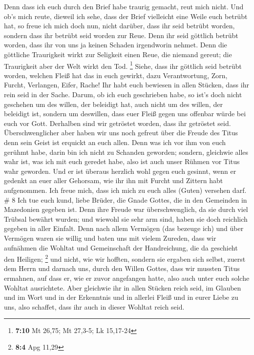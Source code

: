  Denn dass ich euch durch den Brief habe traurig gemacht,
reut mich nicht. Und ob's mich reute, dieweil ich sehe, dass der Brief
vielleicht eine Weile euch betrübt hat,  so freue ich mich
doch nun, nicht darüber, dass ihr seid betrübt worden, sondern dass ihr
betrübt seid worden zur Reue. Denn ihr seid göttlich betrübt worden,
dass ihr von uns ja keinen Schaden irgendworin nehmet. 
Denn die göttliche Traurigkeit wirkt zur Seligkeit einen Reue, die
niemand gereut; die Traurigkeit aber der Welt wirkt den Tod. \footnote{\textbf{7:10}
  Mt 26,75; Mt 27,3-5; Lk 15,17-24}  Siehe, dass ihr
göttlich seid betrübt worden, welchen Fleiß hat das in euch gewirkt,
dazu Verantwortung, Zorn, Furcht, Verlangen, Eifer, Rache! Ihr habt euch
bewiesen in allen Stücken, dass ihr rein seid in der Sache.
 Darum, ob ich euch geschrieben habe, so ist's doch nicht
geschehen um des willen, der beleidigt hat, auch nicht um des willen,
der beleidigt ist, sondern um deswillen, dass euer Fleiß gegen uns
offenbar würde bei euch vor Gott.  Derhalben sind wir
getröstet worden, dass ihr getröstet seid. Überschwenglicher aber haben
wir uns noch gefreut über die Freude des Titus denn sein Geist ist
erquickt an euch allen.  Denn was ich vor ihm von euch
gerühmt habe, darin bin ich nicht zu Schanden geworden; sondern,
gleichwie alles wahr ist, was ich mit euch geredet habe, also ist auch
unser Rühmen vor Titus wahr geworden.  Und er ist überaus
herzlich wohl gegen euch gesinnt, wenn er gedenkt an euer aller
Gehorsam, wie ihr ihn mit Furcht und Zittern habt aufgenommen.
 Ich freue mich, dass ich mich zu euch alles (Guten)
versehen darf. \# 8  Ich tue euch kund, liebe Brüder, die
Gnade Gottes, die in den Gemeinden in Mazedonien gegeben ist.
 Denn ihre Freude war überschwenglich, da sie durch viel
Trübsal bewährt wurden; und wiewohl sie sehr arm sind, haben sie doch
reichlich gegeben in aller Einfalt.  Denn nach allem
Vermögen (das bezeuge ich) und über Vermögen waren sie willig
 und baten uns mit vielem Zureden, dass wir aufnähmen die
Wohltat und Gemeinschaft der Handreichung, die da geschieht den
Heiligen; \footnote{\textbf{8:4} Apg 11,29}  und nicht,
wie wir hofften, sondern sie ergaben sich selbst, zuerst dem Herrn und
darnach uns, durch den Willen Gottes,  dass wir mussten
Titus ermahnen, auf dass er, wie er zuvor angefangen hatte, also auch
unter euch solche Wohltat ausrichtete.  Aber gleichwie ihr
in allen Stücken reich seid, im Glauben und im Wort und in der
Erkenntnis und in allerlei Fleiß und in eurer Liebe zu uns, also
schaffet, dass ihr auch in dieser Wohltat reich seid.

